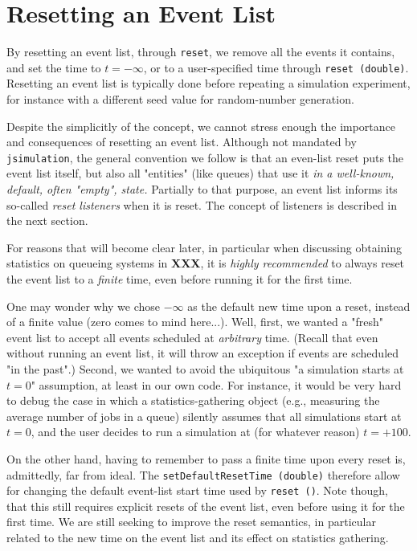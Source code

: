 \documentclass[12pt]{book}
\begin{document}
\section{Resetting an Event List}

By resetting an event list,
  through \lstinline|reset|,
  we remove all the events it contains,
  and set the time to $t=-\infty$,
  or to a user-specified time through
  \lstinline|reset (double)|.
Resetting an event list is typically done before repeating a simulation experiment,
  for instance with a different seed value for random-number generation.

Despite the simplicitly of the concept, we cannot stress enough the importance and consequences of
  resetting an event list.
Although not mandated by \lstinline|jsimulation|,
  the general convention we follow is that an even-list reset puts
  the event list itself, but also all "entities" (like queues) that use it
  {\em in a well-known, default, often "empty", state.}
Partially to that purpose,
  an event list informs its so-called {\em reset listeners\/} when it is reset.
The concept of listeners is described in the next section.

For reasons that will become clear later,
  in particular when discussing obtaining statistics on queueing systems in {\bf XXX},
  it is {\em highly recommended\/} to always reset the event list to a {\em finite\/}
  time, even before running it for the first time.

One may wonder why we chose $-\infty$ as the default new time upon a reset,
  instead of a finite value (zero comes to mind here...).
Well, first, we wanted a "fresh" event list to accept all events scheduled at
  {\em arbitrary\/} time.
(Recall that even without running an event list,
  it will throw an exception if events are scheduled "in the past".)
Second, we wanted to avoid the ubiquitous "a simulation starts at $t=0$" assumption,
  at least in our own code.
For instance,
  it would be very hard to debug the case in which a statistics-gathering object
  (e.g., measuring the average number of jobs in a queue)
  silently assumes that all simulations start at $t=0$,
  and the user decides to run a simulation at (for whatever reason) $t=+100$.

On the other hand,
  having to remember to pass a finite time upon every reset is, admittedly, far from ideal.
The \lstinline|setDefaultResetTime (double)| therefore allow for changing the
  default event-list start time used by \lstinline|reset ()|.
Note though, that this still requires explicit resets of the event list,
  even before using it for the first time.
We are still seeking to improve the reset semantics,
  in particular related to the new time on the event list
  and its effect on statistics gathering.
\end{document}

